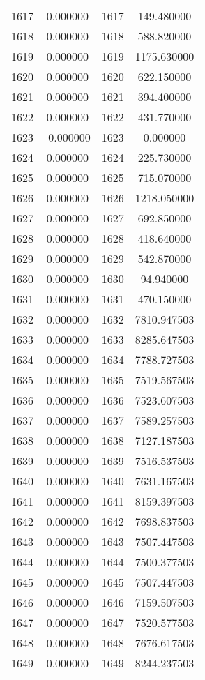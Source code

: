 \documentclass[12pt]{article}
\begin{document}
\begin{longtable}{@{}cccc@{}}
1617 & 0.000000 & 1617 & 149.480000 \\
1618 & 0.000000 & 1618 & 588.820000 \\
1619 & 0.000000 & 1619 & 1175.630000 \\
1620 & 0.000000 & 1620 & 622.150000 \\
1621 & 0.000000 & 1621 & 394.400000 \\
1622 & 0.000000 & 1622 & 431.770000 \\
1623 & -0.000000 & 1623 & 0.000000 \\
1624 & 0.000000 & 1624 & 225.730000 \\
1625 & 0.000000 & 1625 & 715.070000 \\
1626 & 0.000000 & 1626 & 1218.050000 \\
1627 & 0.000000 & 1627 & 692.850000 \\
1628 & 0.000000 & 1628 & 418.640000 \\
1629 & 0.000000 & 1629 & 542.870000 \\
1630 & 0.000000 & 1630 & 94.940000 \\
1631 & 0.000000 & 1631 & 470.150000 \\
1632 & 0.000000 & 1632 & 7810.947503 \\
1633 & 0.000000 & 1633 & 8285.647503 \\
1634 & 0.000000 & 1634 & 7788.727503 \\
1635 & 0.000000 & 1635 & 7519.567503 \\
1636 & 0.000000 & 1636 & 7523.607503 \\
1637 & 0.000000 & 1637 & 7589.257503 \\
1638 & 0.000000 & 1638 & 7127.187503 \\
1639 & 0.000000 & 1639 & 7516.537503 \\
1640 & 0.000000 & 1640 & 7631.167503 \\
1641 & 0.000000 & 1641 & 8159.397503 \\
1642 & 0.000000 & 1642 & 7698.837503 \\
1643 & 0.000000 & 1643 & 7507.447503 \\
1644 & 0.000000 & 1644 & 7500.377503 \\
1645 & 0.000000 & 1645 & 7507.447503 \\
1646 & 0.000000 & 1646 & 7159.507503 \\
1647 & 0.000000 & 1647 & 7520.577503 \\
1648 & 0.000000 & 1648 & 7676.617503 \\
1649 & 0.000000 & 1649 & 8244.237503 \\

\end{longtable}
\end{document}
